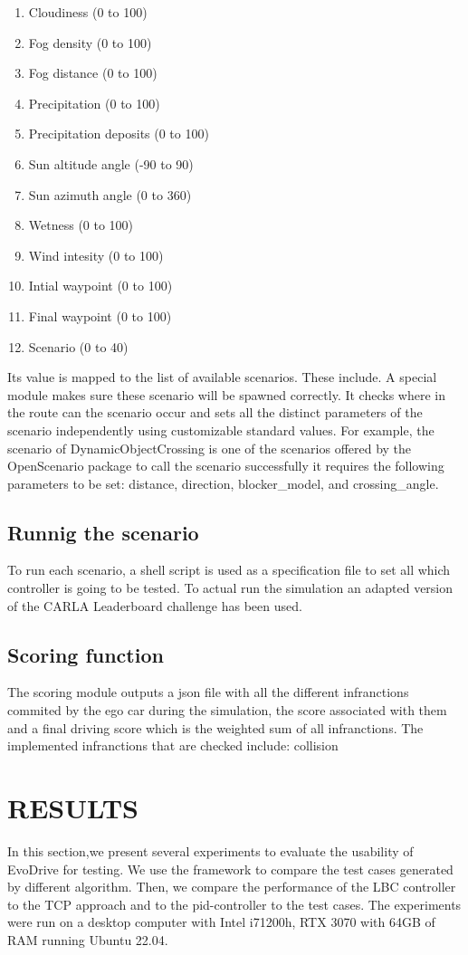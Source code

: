 \documentclass[a4paper, 10pt, conference]{ieeeconf}
\begin{document}
\begin{enumerate}
   \item Cloudiness (0 to 100)
   \item Fog density (0 to 100)
   \item Fog distance (0 to 100)
   \item Precipitation (0 to 100)
   \item Precipitation deposits (0 to 100)
   \item Sun altitude angle (-90 to 90)
   \item Sun azimuth angle (0 to 360)
   \item Wetness (0 to 100)
   \item Wind intesity (0 to 100)
   \item Intial waypoint (0 to 100)
   \item Final waypoint (0 to 100)
   \item Scenario (0 to 40)
\end{enumerate}

Its value is mapped to the list of available scenarios. These include. A special module makes sure these scenario will be spawned correctly. It checks where in the route can the scenario occur and sets all the distinct parameters of the scenario independently using customizable standard values. For example, the scenario of DynamicObjectCrossing is one of the scenarios offered by the OpenScenario package to call the scenario successfully it requires the following parameters to be set: distance, direction, blocker_model, and crossing_angle.

\subsection{Runnig the scenario}
To run each scenario, a shell script is used as a specification file to set all which controller is going to be tested. To actual run the simulation an adapted version of the CARLA Leaderboard challenge has been used.
\subsection{Scoring function}
The scoring module outputs a json file with all the different infranctions commited by the ego car during the simulation, the score associated with them and a final driving score which is the weighted sum of all infranctions. The implemented infranctions that are checked include: collision 
\section{RESULTS}
In this section,we present several experiments to evaluate the usability of EvoDrive for testing. We use the framework to compare the test cases generated by different algorithm. Then, we compare the performance of the LBC controller to the TCP approach and to the pid-controller to the test cases. The experiments were run on a desktop computer with Intel i71200h, RTX 3070 with 64GB of RAM running Ubuntu 22.04.
\end{document}
